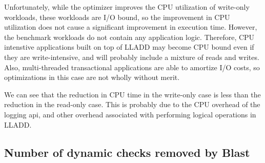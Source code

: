 \documentclass[10pt,letterpaper,twocolumn,english]{article}
\newcommand{\yad}{LLADD\xspace}
\begin{document}
Unfortunately, while the optimizer improves the CPU utilization of
write-only workloads, these workloads are I/O bound, so the
improvement in CPU utilization does not cause a significant improvement
in execution time.  However, the benchmark workloads do not contain
any application logic.  Therefore, CPU intenstive applications built
on top of \yad may become CPU bound even if they are write-intensive,
and will probably include a mixture of reads and writes.  Also,
multi-threaded transactional applications are able to amortize I/O
costs, so optimizations in this case are not wholly without merit.

We can see that the reduction in CPU time in the write-only case is
less than the reduction in the read-only case.  This is probably due
to the CPU overhead of the logging api, and other overhead associated
with performing logical operations in \yad. 



\subsection{Number of dynamic checks removed by Blast}
\end{document}
